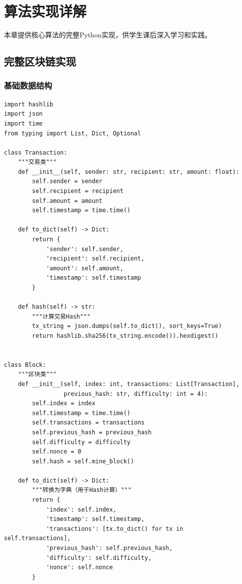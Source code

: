 ﻿\documentclass[12pt,a4paper]{article}
\begin{document}
\section{算法实现详解}

本章提供核心算法的完整Python实现，供学生课后深入学习和实践。

\subsection{完整区块链实现}

\subsubsection{基础数据结构}

\begin{lstlisting}
import hashlib
import json
import time
from typing import List, Dict, Optional

class Transaction:
    """交易类"""
    def __init__(self, sender: str, recipient: str, amount: float):
        self.sender = sender
        self.recipient = recipient
        self.amount = amount
        self.timestamp = time.time()
    
    def to_dict(self) -> Dict:
        return {
            'sender': self.sender,
            'recipient': self.recipient,
            'amount': self.amount,
            'timestamp': self.timestamp
        }
    
    def hash(self) -> str:
        """计算交易Hash"""
        tx_string = json.dumps(self.to_dict(), sort_keys=True)
        return hashlib.sha256(tx_string.encode()).hexdigest()


class Block:
    """区块类"""
    def __init__(self, index: int, transactions: List[Transaction], 
                 previous_hash: str, difficulty: int = 4):
        self.index = index
        self.timestamp = time.time()
        self.transactions = transactions
        self.previous_hash = previous_hash
        self.difficulty = difficulty
        self.nonce = 0
        self.hash = self.mine_block()
    
    def to_dict(self) -> Dict:
        """转换为字典（用于Hash计算）"""
        return {
            'index': self.index,
            'timestamp': self.timestamp,
            'transactions': [tx.to_dict() for tx in self.transactions],
            'previous_hash': self.previous_hash,
            'difficulty': self.difficulty,
            'nonce': self.nonce
        }
    

\end{lstlisting}
\end{document}
